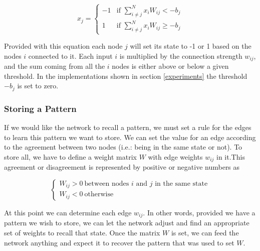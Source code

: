 \documentclass[11pt]{article}
\begin{document}
	\begin{equation} \label{eq:nodeupdate}
		x_j = \begin{cases}
			 -1  & \text{if } \sum^{N}_{i \neq j} x_i W_{ij}  < -b_j \\
			1  & \text{if } \sum^{N}_{i \neq j} x_i W_{ij} \ge -b_j
		\end{cases}
	\end{equation}
	
	Provided with this equation each node $j$ will set its state to -1 or 1 based on the nodes $i$ connected to it. 
	Each input $i$ is multiplied by the connection strength $w_{ij}$, and the sum coming from all the $i$ nodes is either above or below a given threshold. 
	In the implementations shown in section \ref{experiments} the threshold $-b_j$ is set to zero.



	\subsubsection{Storing a Pattern}
	If we would like the network to recall a pattern, we must set a rule for the edges to learn this pattern we want to store. 
	We can set the value for an edge according to the agreement between two nodes (i.e.: being in the same state or not). 
	To store all, we have to define a weight matrix  $W$ with edge weights $w_{ij}$ in it.This agreement or disagreement is represented by positive or negative numbers as
	
	\begin{equation}\label{eq:weights}
	\begin{cases}
		W_{ij} > 0 \ \text{between nodes $i$ and $j$ in the same state}\\
		W_{ij} < 0 \ \text{otherwise}
	\end{cases}
	\end{equation}
	
	At this point we can determine each edge $w_{ij}$. 
	In other words, provided we have a pattern we wish to store, we can let the network adjust and find an appropriate set of weights to recall that state. 
	Once the matrix $W$ is set, we can feed the network anything and expect it to recover the pattern that was used to set $W$. 

\end{document}
